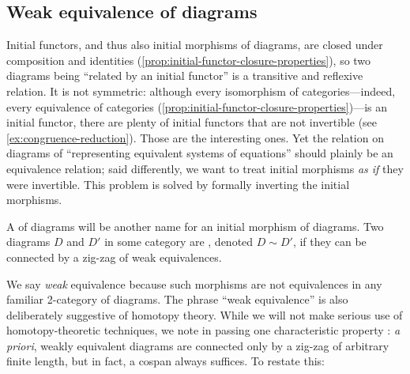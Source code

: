\documentclass[11pt]{article}
\numberwithin{equation}{section}
\begin{document}
\subsection{Weak equivalence of diagrams}
\label{sec:weak-equivalence}

Initial functors, and thus also initial morphisms of diagrams, are closed under
composition and identities (\cref{prop:initial-functor-closure-properties}), so
two diagrams being ``related by an initial functor'' is a transitive and reflexive
relation. It is not symmetric: although every isomorphism of
categories---indeed, every equivalence of categories
(\cref{prop:initial-functor-closure-properties})---is an initial functor, there
are plenty of initial functors that are not invertible (see
\cref{ex:congruence-reduction}). Those are the interesting ones. Yet the
relation on diagrams of ``representing equivalent systems of equations'' should
plainly be an equivalence relation; said differently, we want to treat initial
morphisms \emph{as if} they were invertible. This problem is solved by formally
inverting the initial morphisms.

A  of diagrams will be another name for an initial
morphism of diagrams. Two diagrams $D$ and $D'$ in some category are
, denoted $D \sim D'$, if they can be connected by a
zig-zag of weak equivalences.

We say \emph{weak} equivalence because such morphisms are not equivalences in
any familiar 2-category of diagrams. The phrase ``weak equivalence'' is also
deliberately suggestive of homotopy theory. While we will not make serious use
of homotopy-theoretic techniques, we note in passing one characteristic property
\cite[\S{I.2}]{gabriel1967}: \emph{a priori}, weakly equivalent diagrams are
connected only by a zig-zag of arbitrary finite length, but in fact, a cospan
always suffices. To restate this:
\end{document}
